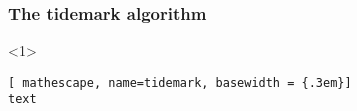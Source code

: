 \documentclass{beamer}
\begin{document}
\begin{frame}[fragile]
\frametitle{The tidemark algorithm}
\begin{onlyenv}<1>
\begin{lstlisting}[ mathescape, name=tidemark, basewidth = {.3em}]
text
\end{lstlisting}
\end{onlyenv}
\end{frame}
\end{document}

